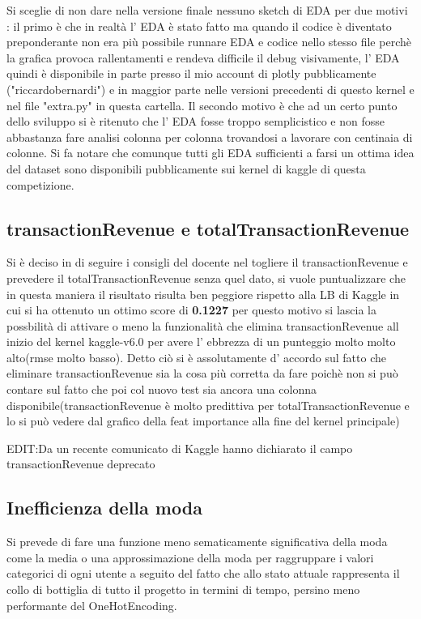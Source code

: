 \documentclass[11pt]{article}
\begin{document}
Si sceglie di non dare nella versione finale nessuno sketch di EDA per
due motivi : il primo è che in realtà l' EDA è stato fatto ma quando il
codice è diventato preponderante non era più possibile runnare EDA e
codice nello stesso file perchè la grafica provoca rallentamenti e
rendeva difficile il debug visivamente, l' EDA quindi è disponibile in
parte presso il mio account di plotly pubblicamente ("riccardobernardi")
e in maggior parte nelle versioni precedenti di questo kernel e nel file
"extra.py" in questa cartella. Il secondo motivo è che ad un certo punto
dello sviluppo si è ritenuto che l' EDA fosse troppo semplicistico e non
fosse abbastanza fare analisi colonna per colonna trovandosi a lavorare
con centinaia di colonne. Si fa notare che comunque tutti gli EDA
sufficienti a farsi un ottima idea del dataset sono disponibili
pubblicamente sui kernel di kaggle di questa competizione.

\subsection{transactionRevenue e
totalTransactionRevenue}\label{transactionrevenue-e-totaltransactionrevenue}

Si è deciso in di seguire i consigli del docente nel togliere il
transactionRevenue e prevedere il totalTransactionRevenue senza quel
dato, si vuole puntualizzare che in questa maniera il risultato risulta
ben peggiore rispetto alla LB di Kaggle in cui si ha ottenuto un ottimo
score di \textbf{0.1227} per questo motivo si lascia la possbilità di
attivare o meno la funzionalità che elimina transactionRevenue all
inizio del kernel kaggle-v6.0 per avere l' ebbrezza di un punteggio
molto molto alto(rmse molto basso). Detto ciò si è assolutamente d'
accordo sul fatto che eliminare transactionRevenue sia la cosa più
corretta da fare poichè non si può contare sul fatto che poi col nuovo
test sia ancora una colonna disponibile(transactionRevenue è molto
predittiva per totalTransactionRevenue e lo si può vedere dal grafico
della feat importance alla fine del kernel principale)

EDIT:Da un recente comunicato di Kaggle hanno dichiarato il campo
transactionRevenue deprecato

\subsection{Inefficienza della moda}\label{inefficienza-della-moda}

Si prevede di fare una funzione meno sematicamente significativa della
moda come la media o una approssimazione della moda per raggruppare i
valori categorici di ogni utente a seguito del fatto che allo stato
attuale rappresenta il collo di bottiglia di tutto il progetto in
termini di tempo, persino meno performante del OneHotEncoding.
\end{document}
